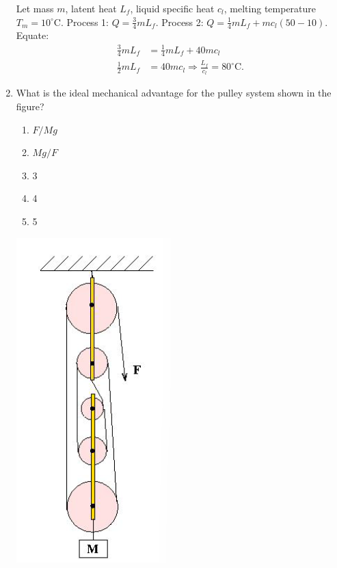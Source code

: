 \documentclass[12pt, a4paper]{article}
\begin{document}
\begin{CJK*}{UTF8}{gbsn}
\begin{enumerate}[itemsep=1.0em, topsep=0.6em]
\begin{solutionbox}
Let mass $m$, latent heat $L_f$, liquid specific heat $c_l$, melting temperature $T_m=10^{\circ}\text{C}$. Process 1: $Q=\tfrac{3}{4}mL_f$. Process 2: $Q=\tfrac{1}{4}mL_f + mc_l(50-10)$. Equate:
\begin{align*}
\tfrac{3}{4} mL_f &= \tfrac{1}{4} mL_f + 40 m c_l \\
\tfrac{1}{2} mL_f &= 40 m c_l \Rightarrow \frac{L_f}{c_l} = 80^{\circ}\text{C}.
\end{align*}
\end{solutionbox}

\newpage

\item \label{prob:5}
\noindent\begin{minipage}[t]{0.6\linewidth}
\vspace{0pt}
What is the ideal mechanical advantage for the pulley system shown in the figure?
\begin{enumerate}[label=(\Alph*)]
    \item $F/Mg$
    \item $Mg/F$
    \item 3
    \item 4
    \item 5
\end{enumerate}
\end{minipage}%
\hfill
\begin{minipage}[t]{0.33\linewidth}
\vspace{0pt}
\centering
\includegraphics[width=0.6\linewidth]{Problem_05_Figure.png}
\end{minipage}


\end{enumerate}
\end{CJK*}
\end{document}
